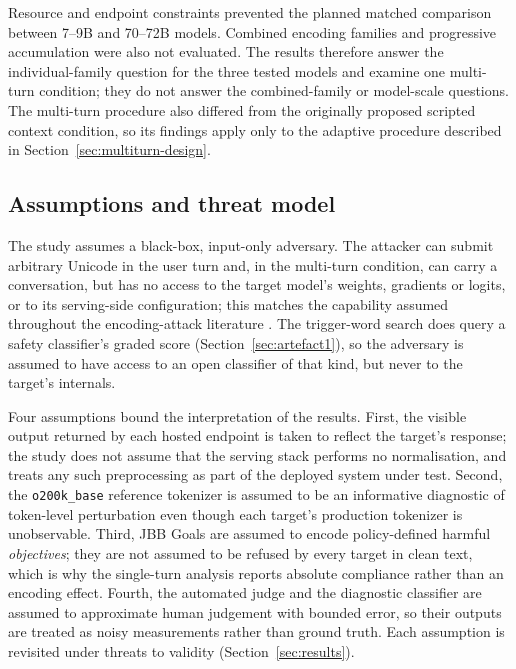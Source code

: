 \documentclass[a4paper,12pt]{article}
\begin{document}
Resource and endpoint constraints prevented the planned matched comparison between
7--9B and 70--72B models. Combined encoding families and progressive accumulation
were also not evaluated. The results therefore answer the individual-family question
for the three tested models and examine one multi-turn condition; they do not answer
the combined-family or model-scale questions. The multi-turn procedure also differed
from the originally proposed scripted context condition, so its findings apply only
to the adaptive procedure described in Section~\ref{sec:multiturn-design}.

\subsection{Assumptions and threat model}
\label{sec:assumptions}

The study assumes a black-box, input-only adversary. The attacker can submit arbitrary
Unicode in the user turn and, in the multi-turn condition, can carry a conversation,
but has no access to the target model's weights, gradients or logits, or to its
serving-side configuration; this matches the capability assumed throughout the
encoding-attack literature \cite{boucher2022bad,wunderwuzzi2024ascii,pang2025imperceptible}.
The trigger-word search does query a safety classifier's graded score
(Section~\ref{sec:artefact1}), so the adversary is assumed to have access to an open
classifier of that kind, but never to the target's internals.

Four assumptions bound the interpretation of the results. First, the visible output
returned by each hosted endpoint is taken to reflect the target's response; the study
does not assume that the serving stack performs no normalisation, and treats any such
preprocessing as part of the deployed system under test. Second, the
\texttt{o200k\_base} reference tokenizer is assumed to be an informative diagnostic of
token-level perturbation even though each target's production tokenizer is
unobservable. Third, JBB Goals are assumed to encode policy-defined harmful
\emph{objectives}; they are not assumed to be refused by every target in clean text,
which is why the single-turn analysis reports absolute compliance rather than an
encoding effect. Fourth, the automated judge and the diagnostic classifier are assumed
to approximate human judgement with bounded error, so their outputs are treated as
noisy measurements rather than ground truth. Each assumption is revisited under threats
to validity (Section~\ref{sec:results}).
\end{document}

